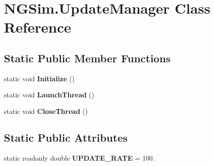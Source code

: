 \hypertarget{class_n_g_sim_1_1_update_manager}{}\section{N\+G\+Sim.\+Update\+Manager Class Reference}
\label{class_n_g_sim_1_1_update_manager}
\subsection*{Static Public Member Functions}
\begin{DoxyCompactItemize}
\item 
\mbox{\label{class_n_g_sim_1_1_update_manager_aecc0a2c41d66f13f876c1bd7cf7f98a7}} 
static void {\bfseries Initialize} ()
\item 
\mbox{\label{class_n_g_sim_1_1_update_manager_a92fc6784347e7004a653f36be375dbf8}} 
static void {\bfseries Launch\+Thread} ()
\item 
\mbox{\label{class_n_g_sim_1_1_update_manager_a2077add79568ae631feea2512bdfa305}} 
static void {\bfseries Close\+Thread} ()
\end{DoxyCompactItemize}
\subsection*{Static Public Attributes}
\begin{DoxyCompactItemize}
\item 
\mbox{\label{class_n_g_sim_1_1_update_manager_a333cbca5ba950cc576bfbb9ed1219512}} 
static readonly double {\bfseries U\+P\+D\+A\+T\+E\+\_\+\+R\+A\+TE} = 100.
\end{DoxyCompactItemize}
